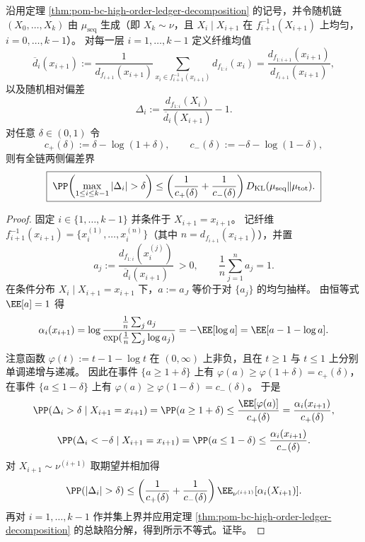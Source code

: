 \begin{theorem}\label{thm:pom-bc-chain-deviation-probability-bound}
沿用定理 \ref{thm:pom-bc-high-order-ledger-decomposition} 的记号，并令随机链 \((X_0,\dots,X_k)\) 由 \(\mu_{\mathrm{seq}}\) 生成（即 \(X_k\sim\nu\)，且 \(X_i\mid X_{i+1}\) 在 \(f_{i+1}^{-1}(X_{i+1})\) 上均匀，\(i=0,\dots,k-1\)）。
对每一层 \(i=1,\dots,k-1\) 定义纤维均值
\[
\overline d_i(x_{i+1})
:=
\frac1{d_{f_{i+1}}(x_{i+1})}\sum_{x_i\in f_{i+1}^{-1}(x_{i+1})} d_{f_{1:i}}(x_i)
=\frac{d_{f_{1:i+1}}(x_{i+1})}{d_{f_{i+1}}(x_{i+1})},
\]
以及随机相对偏差
\[
\Delta_i:=\frac{d_{f_{1:i}}(X_i)}{\overline d_i(X_{i+1})}-1.
\]
对任意 \(\delta\in(0,1)\) 令
\[
c_+(\delta):=\delta-\log(1+\delta),\qquad
c_-(\delta):=-\delta-\log(1-\delta),
\]
则有全链两侧偏差界
\[
\boxed{\;
\PP\!\left(\max_{1\le i\le k-1} |\Delta_i|>\delta\right)
\le
\left(\frac{1}{c_+(\delta)}+\frac{1}{c_-(\delta)}\right)
D_{\mathrm{KL}}(\mu_{\mathrm{seq}}\|\mu_{\mathrm{tot}}).
\;}
\]
\end{theorem}
\begin{proof}
固定 \(i\in\{1,\dots,k-1\}\) 并条件于 \(X_{i+1}=x_{i+1}\)。
记纤维 \(f_{i+1}^{-1}(x_{i+1})=\{x_i^{(1)},\dots,x_i^{(n)}\}\)（其中 \(n=d_{f_{i+1}}(x_{i+1})\)），并置
\[
a_j:=\frac{d_{f_{1:i}}(x_i^{(j)})}{\overline d_i(x_{i+1})}\ >0,
\qquad
\frac1n\sum_{j=1}^{n}a_j=1.
\]
在条件分布 \(X_i\mid X_{i+1}=x_{i+1}\) 下，\(a:=a_J\) 等价于对 \(\{a_j\}\) 的均匀抽样。
由恒等式 \(\EE[a]=1\) 得
\[
\alpha_i(x_{i+1})
=\log\frac{\frac1n\sum_j a_j}{\exp(\frac1n\sum_j\log a_j)}
=-\EE[\log a]
=\EE[a-1-\log a].
\]
注意函数 \(\varphi(t):=t-1-\log t\) 在 \((0,\infty)\) 上非负，且在 \(t\ge 1\) 与 \(t\le 1\) 上分别单调递增与递减。
因此在事件 \(\{a\ge 1+\delta\}\) 上有
\(
\varphi(a)\ge \varphi(1+\delta)=c_+(\delta)
\)，在事件 \(\{a\le 1-\delta\}\) 上有
\(
\varphi(a)\ge \varphi(1-\delta)=c_-(\delta)
\)。
于是
\[
\PP(\Delta_i>\delta\mid X_{i+1}=x_{i+1})
=\PP(a\ge 1+\delta)
\le \frac{\EE[\varphi(a)]}{c_+(\delta)}
=\frac{\alpha_i(x_{i+1})}{c_+(\delta)},
\]
\[
\PP(\Delta_i<-\delta\mid X_{i+1}=x_{i+1})
=\PP(a\le 1-\delta)
\le \frac{\alpha_i(x_{i+1})}{c_-(\delta)}.
\]
对 \(X_{i+1}\sim\nu^{(i+1)}\) 取期望并相加得
\[
\PP(|\Delta_i|>\delta)
\le
\left(\frac{1}{c_+(\delta)}+\frac{1}{c_-(\delta)}\right)\EE_{\nu^{(i+1)}}[\alpha_i(X_{i+1})].
\]
再对 \(i=1,\dots,k-1\) 作并集上界并应用定理 \ref{thm:pom-bc-high-order-ledger-decomposition} 的总缺陷分解，得到所示不等式。证毕。
\end{proof}

\endinput
